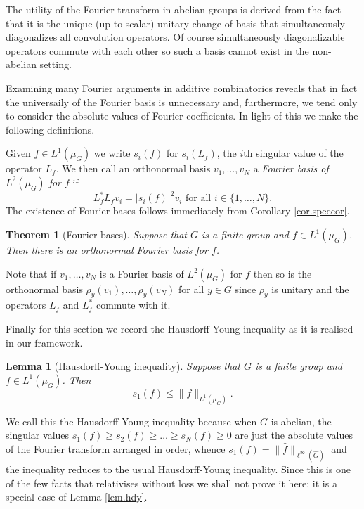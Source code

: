 \documentclass[12pt]{amsart}
\numberwithin{equation}{section}
\theoremstyle{plain}
\newtheorem{theorem}[subsection]{Theorem}
\newtheorem{lemma}[subsection]{Lemma}
\theoremstyle{definition}
\renewcommand{\leq}{\leqslant}
\renewcommand{\geq}{\geqslant}
\newcommand{\wh}{\widehat}
\begin{document}
The utility of the Fourier transform in abelian groups is derived from the fact that it is the unique (up to scalar) unitary change of basis that simultaneously diagonalizes all convolution operators.  Of course simultaneously diagonalizable operators commute with each other so such a basis cannot exist in the non-abelian setting.

Examining many Fourier arguments in additive combinatorics reveals that in fact the universaily of the Fourier basis is unnecessary and, furthermore, we tend only to consider the absolute values of Fourier coefficients.  In light of this we make the following definitions. 

Given $f \in L^1(\mu_G)$ we write $s_i(f)$ for $s_i(L_f)$, the $i$th singular value of the operator $L_f$.  We then call an orthonormal basis $v_1,\dots,v_N$ a \emph{Fourier basis of $L^2(\mu_G)$ for $f$} if
\begin{equation*}
L_f^*L_fv_i = |s_i(f)|^2v_i \textrm{ for all } i \in \{1,\dots, N\}.
\end{equation*}
The existence of Fourier bases follows immediately from Corollary \ref{cor.speccor}.
\begin{theorem}[Fourier bases]
Suppose that $G$ is a finite group and $f \in L^1(\mu_G)$. Then there is an orthonormal Fourier basis for $f$.
\end{theorem}
Note that if $v_1,\dots,v_N$ is a Fourier basis of $L^2(\mu_G)$ for $f$ then so is the orthonormal basis $\rho_y(v_1),\dots,\rho_y(v_N)$ for all $y \in G$ since $\rho_y$ is unitary and the operators $L_f$ and $L_f^*$ commute with it.

Finally for this section we record the Hausdorff-Young inequality as it is realised in our framework.
\begin{lemma}[Hausdorff-Young inequality]
Suppose that $G$ is a finite group and $f \in L^1(\mu_G)$.  Then
\begin{equation*}
s_1(f) \leq \|f\|_{L^1(\mu_{G})}.
\end{equation*}
\end{lemma}
We call this the Hausdorff-Young inequality because when $G$ is abelian, the singular values $s_1(f) \geq s_2(f) \geq \dots \geq s_N(f)\geq 0$ are just the absolute values of the Fourier transform arranged in order, whence $s_1(f)=\|\wh{f}\|_{\ell^\infty(\wh{G})}$ and the inequality reduces to the usual Hausdorff-Young inequality.  Since this is one of the few facts that relativises without loss we shall not prove it here; it is a special case of Lemma \ref{lem.hdy}.
\end{document}
